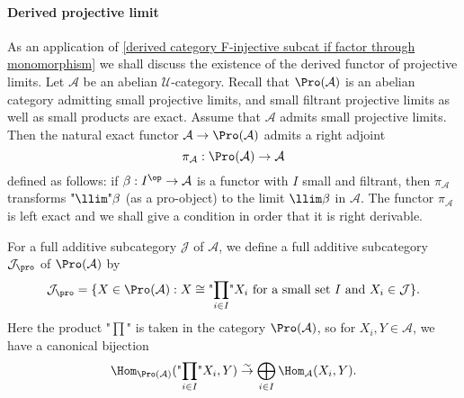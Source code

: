 \paragraph{Derived projective limit}
As an application of \cref{derived category F-injective subcat if factor through monomorphism} we shall discuss the existence of the derived functor of projective limits. Let $\mathcal{A}$ be an abelian $\mathscr{U}$-category. Recall that $\Pro(\mathcal{A})$ is an abelian category admitting small projective limits, and small filtrant projective limits as well as small products are exact. Assume that $\mathcal{A}$ admits small projective limits. Then the natural exact functor $\mathcal{A}\to\Pro(\mathcal{A})$ admits a right adjoint
\[\pi_\mathcal{A}:\Pro(\mathcal{A})\to\mathcal{A}\]
defined as follows: if $\beta:I^{\op}\to\mathcal{A}$ is a functor with $I$ small and filtrant, then $\pi_\mathcal{A}$ transforms $\text{"$\llim$"}\beta$ (as a pro-object) to the limit $\llim\beta$ in $\mathcal{A}$. The functor $\pi_\mathcal{A}$ is left exact and we shall give a condition in order that it is right derivable.\par
For a full additive subcategory $\mathcal{J}$ of $\mathcal{A}$, we define a full additive subcategory $\mathcal{J}_{\pro}$ of $\Pro(\mathcal{A})$ by
\[\mathcal{J}_{\pro}=\{X\in\Pro(\mathcal{A}):\text{$X\cong\underset{i\in I}{\text{"$\prod$"}}X_i$ for a small set $I$ and $X_i\in\mathcal{J}$}\}.\]
Here the product "$\prod$" is taken in the category $\Pro(\mathcal{A})$, so for $X_i,Y\in\mathcal{A}$, we have a canonical bijection
\[\Hom_{\Pro(\mathcal{A})}(\underset{i\in I}{\text{"$\prod$"}}X_i,Y)\stackrel{\sim}{\to} \bigoplus_{i\in I}\Hom_{\mathcal{A}}(X_i,Y).\]


